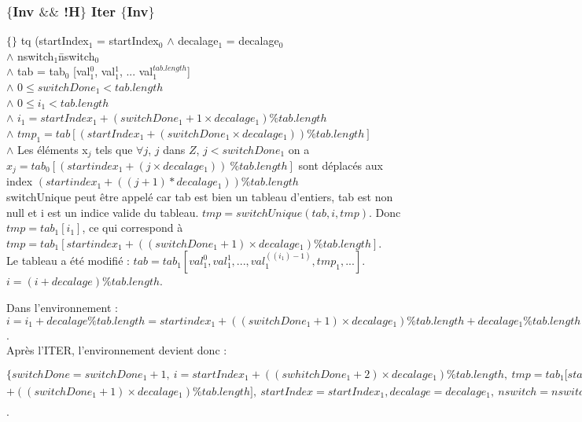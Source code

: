 \subsubsection*{$\{$Inv $\&\&$ !H$\}$ Iter $\{$Inv$\}$}

$\{\}$ tq (startIndex$_{1}$ = startIndex$_{0}$
$\wedge$ decalage$_{1}$ = decalage$_{0}$\\
$\wedge$ nswitch$_{1}$\= nswitch$_{0}$\\
$\wedge$ tab = tab$_{0}$ [val$_{1}^{0}$, val$_{1}^{1}$, ... val$_{1}^{tab.length}$]\\
$\wedge$ $0\leq switchDone_{1} < tab.length$\\
$\wedge$ $0\leq i_{1} < tab.length$\\
$\wedge$ $i_{1} = startIndex_{1} + (switchDone_{1}+1\times decalage_{1}) \% tab.length$\\
$\wedge$ $tmp_{1} = tab[(startIndex_{1} + (switchDone_{1}\times decalage_{1}))  \% tab.length]$\\
$\wedge$ Les éléments x$_{j}$ tels que $\forall j$, $j$ dans $Z$, $j<switchDone_{1}$ on a $x_{j}=tab_{0}[(startindex_{1} + (j\times decalage_{1}))\ \% tab.length]$ sont déplacés aux index $(startindex_{1} + ((j+1)* decalage_{1}))\%tab.length$\\

switchUnique peut être appelé car tab est bien un tableau d'entiers, tab est non null et i est un indice valide du tableau. $tmp = switchUnique(tab, i, tmp)$. Donc $tmp = tab_{1}[i_1]$, ce qui correspond à $tmp = tab_{1}[startindex_{1} + ((switchDone_{1}+1)\times decalage_{1}) \% tab.length]$.\\

Le tableau a été modifié : $tab = tab_{1}[val_{1}^{0},val_{1}^{1}, ..., val_{1}^{((i_1)-1)}, tmp_{1}, ...]$.\\

 $i = (i+decalage) \% tab.length$.
 
 Dans l'environnement : $i = i_{1} + decalage \% tab.length = startindex_{1} + ((switchDone_{1}+1)\times decalage_{1}) \% tab.length  + decalage_{1} \%tab.length = startIndex_{1} + ((swhitchDone_{1}+2)\times decalage_{1}) \%tab.length. switchDone++$.\\
 
Après l'ITER, l'environnement devient donc : 

\noindent$\{switchDone = switchDone_{1}+1,\ i = startIndex_{1} + ((swhitchDone_{1}+2)\times decalage_1) \%tab.length,\ tmp = tab_{1}[startindex_{1}$ $+ ((switchDone_{1}+1)\times decalage_{1}) \% tab.length],\ startIndex = startIndex_{1}, decalage = decalage_{1},\ nswitch = nswitch_{1},\ tab = tab_{1}[val_{1}^{0},val_{1}^{1}, ..., val_{1}^{((i_1)-1)}, tmp_{1}, ...]\} tq (...)$.\\

